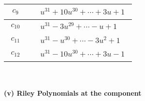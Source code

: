 \documentclass[1p]{elsarticle_modified}
\theoremstyle{definition}
\begin{document}
\begin{tabular}{m{50pt}|m{274pt}}
\hline $$\begin{aligned}c_{9}\end{aligned}$$&$\begin{aligned}
&u^{31}+10 u^{30}+\cdots+3 u+1
\end{aligned}$\\
\hline $$\begin{aligned}c_{10}\end{aligned}$$&$\begin{aligned}
&u^{31}-3 u^{29}+\cdots- u+1
\end{aligned}$\\
\hline $$\begin{aligned}c_{11}\end{aligned}$$&$\begin{aligned}
&u^{31}- u^{30}+\cdots-3 u^2+1
\end{aligned}$\\
\hline $$\begin{aligned}c_{12}\end{aligned}$$&$\begin{aligned}
&u^{31}-10 u^{30}+\cdots+3 u-1
\end{aligned}$\\
\hline
\end{tabular}\\~\\
\newpage\renewcommand{\arraystretch}{1}
\flushleft \textbf{(v) Riley Polynomials at the component}\newline \\
\end{document}
